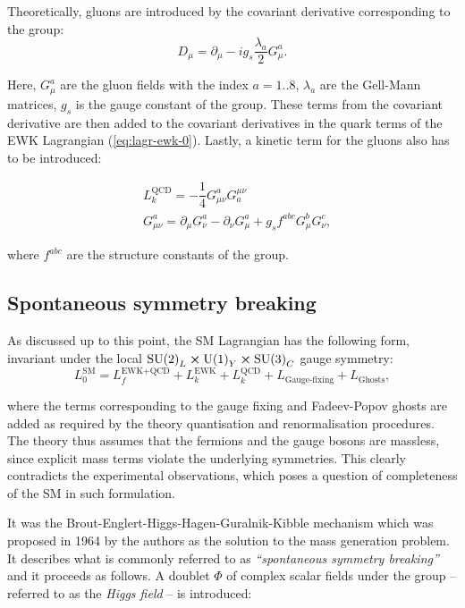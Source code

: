 Theoretically, gluons are introduced by the covariant derivative corresponding to the \suthr group:
\begin{equation}
    D_\mu = \partial_\mu - ig_s\dfrac{\lambda_a}{2}G_\mu^a.
\end{equation}

Here, $G_\mu^a$ are the gluon fields with the index $a=1..8$, $\lambda_a$ are the Gell-Mann matrices, $g_s$ is the gauge constant of the \suthr group. These terms from the covariant derivative are then added to the covariant derivatives in the quark terms of the EWK Lagrangian (\ref{eq:lagr-ewk-0}). Lastly, a kinetic term for the gluons also has to be introduced:

\begin{align}
    &L_k^\text{QCD} = -\dfrac{1}{4}G_{\mu\nu}^aG^{\mu\nu}_a\\
    &G_{\mu\nu}^a = \partial_\mu G_\nu^a - \partial_\nu G_\mu^a + g_s f^{abc}G_\mu^b G_\nu^c,
\end{align}

where $f^{abc}$ are the structure constants of the \suthr group.

\subsection{Spontaneous symmetry breaking}\label{sec:break}

As discussed up to this point, the SM Lagrangian has the following form, invariant under the local $\text{SU(2)}_L \cross \text{U(1)}_Y \cross \text{SU(3)}_C$ gauge symmetry:
\begin{equation}
    L_0^\text{SM} = L_f^\text{EWK+QCD} + L_k^\text{EWK} + L_k^\text{QCD} + L_\text{Gauge-fixing} + L_\text{Ghosts},
\end{equation}

where the terms corresponding to the gauge fixing and Fadeev-Popov ghosts are added as required by the theory quantisation and renormalisation procedures. The theory thus assumes that the fermions and the gauge bosons are massless, since explicit mass terms violate the underlying symmetries. This clearly contradicts the experimental observations, which poses a question of completeness of the SM in such formulation.

It was the Brout-Englert-Higgs-Hagen-Guralnik-Kibble
mechanism \cite{Englert:1964et,Higgs:1964ia,Higgs:1964pj,Guralnik:1964eu} which was proposed in 1964 by the authors as the solution to the mass generation problem. It describes what is commonly referred to as \textit{\enquote{spontaneous symmetry breaking}} and it proceeds as follows. A doublet $\Phi$ of complex scalar fields under the \sutwo group -- referred to as the \textit{Higgs field} -- is introduced:

